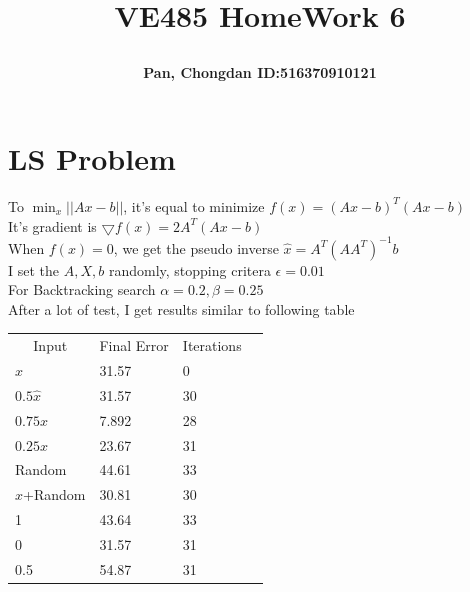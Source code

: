 \documentclass[a4paper]{article}
\title{\Large \textbf{VE485 HomeWork 6}\\
\author{\textbf{Pan, Chongdan ID:516370910121}\\
}
}
\begin{document}
\maketitle
\section{LS Problem}
\noindent To $\min_x ||Ax-b||$, it's equal to minimize $f(x)=(Ax-b)^T(Ax-b)$
\\It's gradient is $\bigtriangledown f(x)=2A^T(Ax-b)$
\\When $f(x)=0$, we get the pseudo inverse $\hat{x}=A^T(AA^T)^{-1}b$
\\I set the $A,X,b$ randomly, stopping critera $\epsilon=0.01$
\\For Backtracking search $\alpha=0.2,\beta=0.25$
\\After a lot of test, I get results similar to following table
\begin{table}[H]
    \centering
    \begin{tabular}{|l|l|l|l}
    \cline{1-3}
    \multicolumn{1}{|c|}{Input} & \multicolumn{1}{c|}{Final Error} & \multicolumn{1}{c|}{Iterations} &  \\ \cline{1-3}
    $\hat{x}$       &  31.57    &0      &  \\ \cline{1-3}
    $0.5\hat{x}$    &  31.57    &30     &  \\ \cline{1-3}
    $0.75x$         &  7.892    &28     &  \\ \cline{1-3}
    $0.25x$         &  23.67    &31     &  \\ \cline{1-3}
    Random          &  44.61    &33     &  \\ \cline{1-3}
    $x$+Random      &  30.81    &30     &  \\ \cline{1-3}
    1               &  43.64    &33     &  \\ \cline{1-3}
    0               &  31.57    &31     &  \\ \cline{1-3}
    0.5             &  54.87    &31     &  \\ \cline{1-3}
    \end{tabular}
\end{table}
\end{document}
